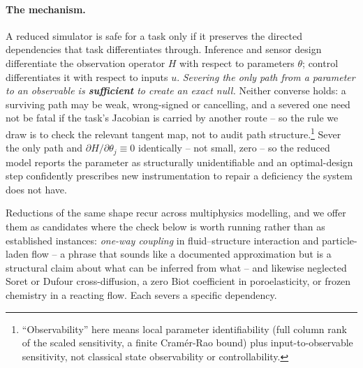 \documentclass{article}
\begin{document}
\paragraph{The mechanism.}\label{sec:intro-mech} A reduced simulator is safe for a task only if it preserves the directed
dependencies that task differentiates through. Inference and sensor design differentiate the
observation operator $H$ with respect to parameters $\theta$; control differentiates it with respect
to inputs $u$. \emph{Severing the only path from a parameter to an observable is
\textbf{sufficient} to create an exact null.} Neither converse holds: a surviving path may be weak,
wrong-signed or cancelling, and a severed one need not be fatal if the task's Jacobian is carried by
another route -- so the rule we draw is to check the relevant tangent map, not to audit path
structure.\footnote{``Observability'' here means local parameter identifiability (full column rank of the
scaled sensitivity, a finite Cram\'er-Rao bound) plus input-to-observable sensitivity, not classical
state observability or controllability.} Sever the only path and
$\partial H/\partial\theta_j\equiv0$ identically -- not small, zero -- so the reduced model reports
the parameter as structurally unidentifiable and an optimal-design step confidently prescribes new
instrumentation to repair a deficiency the system does not have.

Reductions of the same shape recur across multiphysics modelling, and we offer them as candidates
where the check below is worth running rather than as established instances: \emph{one-way coupling}
in fluid--structure interaction and particle-laden flow -- a phrase that sounds like a documented
approximation but is a structural claim about what can be inferred from what -- and likewise neglected
Soret or Dufour cross-diffusion, a zero Biot coefficient in poroelasticity, or frozen chemistry in a
reacting flow. Each severs a specific dependency.
\end{document}
